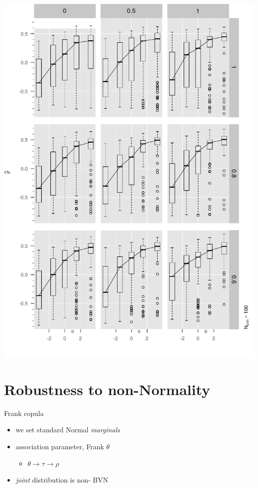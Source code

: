 \begin{frame}

\begin{center}
  \includegraphics[width=1.00\textwidth]{Figure2/boxplotArray2.pdf}
\end{center}

\end{frame}

\hypertarget{robustness-to-non-normality}{%
\section{Robustness to
non-Normality}\label{robustness-to-non-normality}}

\begin{frame}{Frank copula}
\protect\hypertarget{frank-copula}{}

\begin{itemize}
\tightlist
\item
  we set standard Normal \emph{marginals}
\item
  association parameter, Frank \(\theta\)

  \begin{itemize}
  \tightlist
  \item
    \(\theta \rightarrow \tau \rightarrow \rho\)
  \end{itemize}
\item
  \emph{joint} distribution is \alert{non-} BVN
\end{itemize}

\end{frame}

